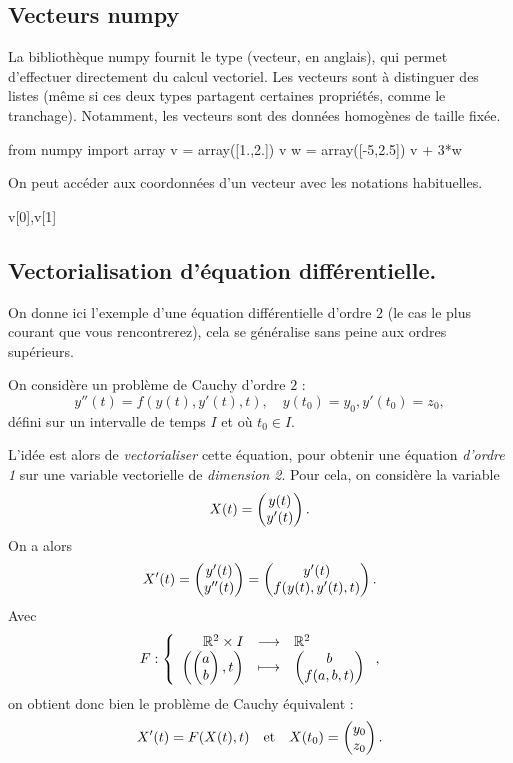 \subsection{Vecteurs numpy}

La bibliothèque numpy fournit le type  (vecteur, en anglais), qui permet d'effectuer directement du calcul vectoriel. 
Les vecteurs sont à distinguer des listes (même si ces deux types partagent certaines propriétés, comme le tranchage). Notamment, les vecteurs sont des données homogènes de taille fixée. 

\begin{pyconsole}
from numpy import array
v = array([1.,2.])
v
w = array([-5,2.5])
v + 3*w
\end{pyconsole}
On peut accéder aux coordonnées d'un vecteur avec les notations habituelles. 
\begin{pyconsole}
v[0],v[1]
\end{pyconsole}

\subsection{Vectorialisation d'équation différentielle.}

On donne ici l'exemple d'une équation différentielle d'ordre $2$ (le cas le plus courant que vous rencontrerez), cela se généralise sans peine aux ordres supérieurs. 

On considère un problème de Cauchy d'ordre $2$ : 
\begin{equation*}
    y''(t) = f(y(t),y'(t),t), \quad y(t_0) = y_0, y'(t_0) = z_0, 
\end{equation*}
défini sur un intervalle de temps $I$ et où $t_0\in I$. 

L'idée est alors de \emph{vectorialiser} cette équation, pour obtenir une équation \emph{d'ordre 1} sur une variable vectorielle de \emph{dimension 2}. 
Pour cela, on considère la variable 
\begin{equation*}
    X(t) = \begin{pmatrix} y(t) \\ y'(t) \end{pmatrix}.
\end{equation*}
On a alors 
\begin{equation*}
    X'(t) = \begin{pmatrix} y'(t) \\ y''(t) \end{pmatrix} = \begin{pmatrix} y'(t) \\ f(y(t),y'(t),t) \end{pmatrix}. 
\end{equation*}
Avec 
\begin{equation*}
    F : \left\{\begin{array}{rcl} \mathbb{R}^2\times I& \longrightarrow &\mathbb{R}^2 \\ \left( \begin{pmatrix} a\\b \end{pmatrix} , t \right) &\longmapsto &  \begin{pmatrix} b \\ f(a,b,t) \end{pmatrix}\end{array}\right.,
\end{equation*}
on obtient donc bien le problème de Cauchy équivalent : 
\begin{equation*}
    X'(t) = F(X(t),t) \quad\textrm{et}\quad X(t_0) = \begin{pmatrix} y_0 \\z_0 \end{pmatrix}. 
\end{equation*}

